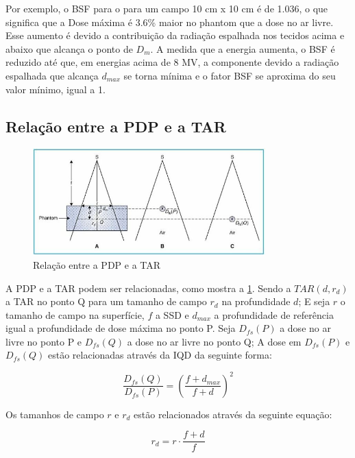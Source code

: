 \documentclass[11pt,a4paper]{article}
\newcounter{exemplo}
\begin{document}
	Por exemplo, o BSF para o  para um campo 10 cm x 10 cm é de 1.036, o que significa que a Dose máxima é 3.6\% maior no phantom que a dose no ar livre. Esse aumento é devido a contribuição da radiação espalhada nos tecidos acima e abaixo que alcança o ponto de $D_{m}$. A medida que a energia aumenta, o BSF é reduzido até que, em energias acima de 8 MV, a componente devido a radiação espalhada que alcança $d_{max}$ se torna mínima e o fator BSF se aproxima do seu valor mínimo, igual a 1. 


	\subsection{Relação entre a PDP e a TAR}

	\begin{figure}[h]
		\centering
		\includegraphics[width=0.8\textwidth]{Imagens/pdpETar.JPG}
		\caption{Relação entre a PDP e a TAR}
		\label{fig:pdpETar}                
	\end{figure}

	A PDP e a TAR podem ser relacionadas, como mostra a \ref{fig:pdpETar}. Sendo a $TAR(d, r_d)$ a TAR no ponto Q para um tamanho de campo $r_d$ na profundidade $d$; E seja $r$ o tamanho de campo na superfície, $f$ a SSD e $d_{max}$ a profundidade de referência igual a profundidade de dose máxima no ponto P. Seja $D_{fs}(P)$ a dose no ar livre no ponto P e $D_{fs}(Q)$ a dose no ar livre no ponto Q; A dose em $D_{fs}(P)$ e $D_{fs}(Q)$ estão relacionadas através da IQD da seguinte forma:

		\begin{equation}
			\frac{D_{fs}(Q)}{D_{fs}(P)} = \left(\frac{f + d_{max}}{f + d}\right)^2
		\end{equation}

	Os tamanhos de campo $r$ e $r_d$ estão relacionados através da seguinte equação:

		\begin{equation}
			r_d = r \cdot \frac{f + d}{f}
		\end{equation}
\end{document}
